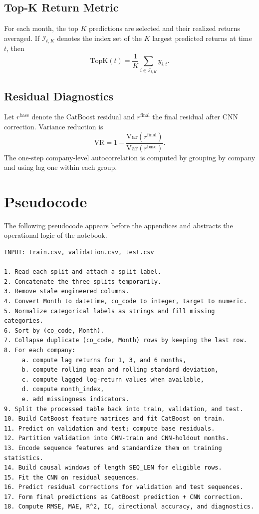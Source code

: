 \documentclass[11pt]{article}
\newcommand{\1}{\mathbf{1}}
\newcommand{\Var}{\mathrm{Var}}
\begin{document}
\subsection{Top-K Return Metric}

For each month, the top $K$ predictions are selected and their realized returns averaged. If $\mathcal{I}_{t,K}$ denotes the index set of the $K$ largest predicted returns at time $t$, then
\[
\mathrm{TopK}(t) = \frac{1}{K} \sum_{i \in \mathcal{I}_{t,K}} y_{i,t}.
\]

\subsection{Residual Diagnostics}

Let $r^{\mathrm{base}}$ denote the CatBoost residual and $r^{\mathrm{final}}$ the final residual after CNN correction. Variance reduction is
\[
\mathrm{VR} = 1 - \frac{\Var(r^{\mathrm{final}})}{\Var(r^{\mathrm{base}})}.
\]
The one-step company-level autocorrelation is computed by grouping by company and using lag one within each group.

\section{Pseudocode}

The following pseudocode appears before the appendices and abstracts the operational logic of the notebook.

\begin{verbatim}
INPUT: train.csv, validation.csv, test.csv

1. Read each split and attach a split label.
2. Concatenate the three splits temporarily.
3. Remove stale engineered columns.
4. Convert Month to datetime, co_code to integer, target to numeric.
5. Normalize categorical labels as strings and fill missing categories.
6. Sort by (co_code, Month).
7. Collapse duplicate (co_code, Month) rows by keeping the last row.
8. For each company:
     a. compute lag returns for 1, 3, and 6 months,
     b. compute rolling mean and rolling standard deviation,
     c. compute lagged log-return values when available,
     d. compute month_index,
     e. add missingness indicators.
9. Split the processed table back into train, validation, and test.
10. Build CatBoost feature matrices and fit CatBoost on train.
11. Predict on validation and test; compute base residuals.
12. Partition validation into CNN-train and CNN-holdout months.
13. Encode sequence features and standardize them on training statistics.
14. Build causal windows of length SEQ_LEN for eligible rows.
15. Fit the CNN on residual sequences.
16. Predict residual corrections for validation and test sequences.
17. Form final predictions as CatBoost prediction + CNN correction.
18. Compute RMSE, MAE, R^2, IC, directional accuracy, and diagnostics.
\end{verbatim}
\end{document}
